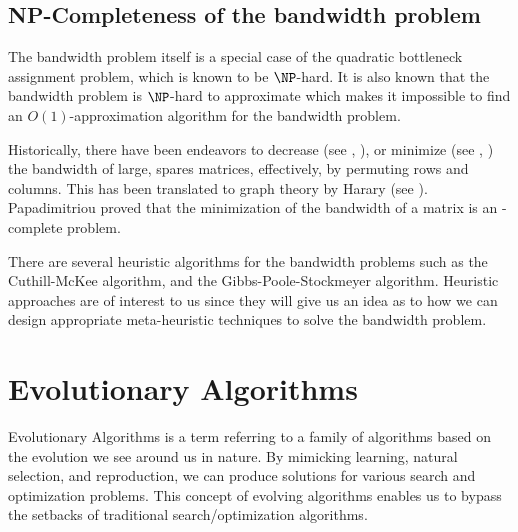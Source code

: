 \documentclass[conference,compsoc]{IEEEtran}
\begin{document}
\subsection{NP-Completeness of the bandwidth problem} \label{npp}

The bandwidth problem itself is a special case of the quadratic bottleneck assignment problem, which is known to be 
$\NP$-hard. It is also known that the bandwidth problem is $\NP$-hard to approximate which makes it impossible to find 
an $O(1)$-approximation algorithm for the bandwidth problem. 

Historically, there have been endeavors to decrease (see \cite{10.1145/800195.805928}, \cite{sparse}), or minimize 
(see \cite{chen}, \cite{chen2}) 
the bandwidth of large, spares matrices, effectively, by permuting rows and columns. 
This has been translated to graph theory by Harary (see \cite{1973141}). 
Papadimitriou proved that the minimization of the bandwidth of a matrix is an 
\NP-complete problem. \cite{papadimitriou_1976}

There are several heuristic algorithms for the bandwidth problems such as the Cuthill-McKee algorithm, and the 
Gibbs-Poole-Stockmeyer algorithm. Heuristic approaches are of interest to us since they will give us an 
idea as to how we can design appropriate meta-heuristic techniques to solve the bandwidth problem. 

\section{Evolutionary Algorithms}
Evolutionary Algorithms is a term referring to a 
family of algorithms based on the evolution we see around us in nature. By mimicking learning, 
natural selection, and reproduction, we can produce solutions for various search and optimization problems. 
This concept of evolving algorithms enables us to bypass the setbacks of traditional search/optimization algorithms.
\end{document}
